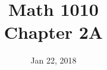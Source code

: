 \documentclass[12pt]{article}
\begin{document}
\title{\bf Math 1010 \\ Chapter 2A}
\date{Jan 22, 2018}
\maketitle





\renewcommand{\theenumi}{\alph{enumi}}
\renewcommand{\labelenumi}{(\theenumi)}



\pagebreak





\pagebreak



\end{document}
